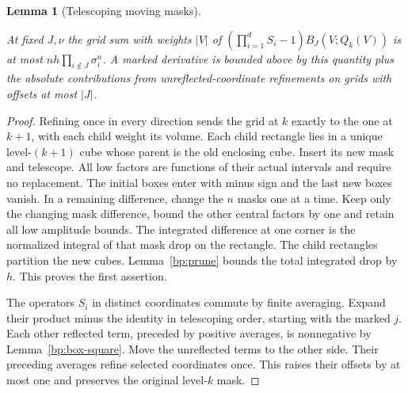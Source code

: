 \documentclass[11pt,letterpaper]{article}
\newtheorem{lemma}[theorem]{Lemma}
\theoremstyle{definition}
\providecommand{\lean}[1]{}
\providecommand{\uses}[1]{}
\begin{document}
\begin{lemma}[Telescoping moving masks]\label{bp:box-boundary}
\lean{TwistedParaproduct.boxBoundary}
At fixed \(J,\nu\) the grid sum with weights \(|V|\) of
\((\prod_{i=1}^d S_i-1)B_J(V;Q_k(V))\) is at most
\(nh\prod_{i\notin J}\sigma_i^n\). A marked derivative is bounded
above by this quantity plus the absolute contributions from
unreflected-coordinate refinements on grids with offsets at most
\(|J|\).
\end{lemma}
\begin{proof}
\uses{bp:prune,bp:box-square,bp:marginal}
Refining once in every direction sends the grid at \(k\) exactly to
the one at \(k+1\), with each child weight its volume. Each child
rectangle lies in a unique level-\((k+1)\) cube whose parent is the
old enclosing cube. Insert its new mask and telescope. All low factors
are functions of their actual intervals and require no replacement.
The initial boxes enter with minus sign and the last new boxes vanish.
In a remaining difference, change the \(n\) masks one at a time. Keep
only the changing mask difference, bound the other central factors by
one and retain all low amplitude bounds. The integrated difference at
one corner is the normalized integral of that mask drop on the
rectangle. The child rectangles partition the new cubes.
Lemma~\ref{bp:prune} bounds the total integrated drop by \(h\).
This proves the first assertion.

The operators \(S_i\) in distinct coordinates commute by finite
averaging. Expand their product minus the identity in telescoping
order, starting with the marked \(j\). Each other reflected term,
preceded by positive averages, is nonnegative by
Lemma~\ref{bp:box-square}. Move the unreflected terms to the other side.
Their preceding averages refine selected coordinates once. This
raises their offsets by at most one and preserves the original
level-\(k\) mask.
\end{proof}
\end{document}
